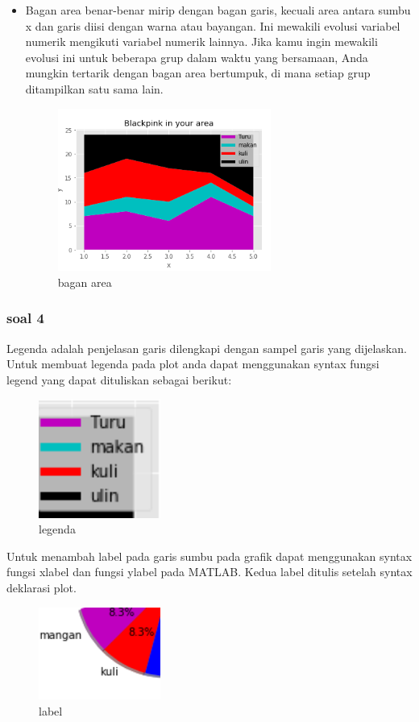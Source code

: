 \begin{itemize}
\item Bagan area benar-benar mirip dengan bagan garis, kecuali area antara sumbu x dan garis diisi dengan warna atau bayangan. Ini mewakili evolusi variabel numerik mengikuti variabel numerik lainnya. Jika kamu ingin mewakili evolusi ini untuk beberapa grup dalam waktu yang bersamaan, Anda mungkin tertarik dengan bagan area bertumpuk, di mana setiap grup ditampilkan satu sama lain.

\begin{figure}[H]
\centering
\includegraphics[width=7cm]{figures/6/1174009/1e.png}
\caption{bagan area}
\label{dwiyul}
\end{figure}

\end{itemize}

\subsubsection{soal 4}
Legenda adalah penjelasan garis dilengkapi dengan sampel garis yang dijelaskan. Untuk membuat legenda pada plot anda dapat menggunakan syntax fungsi legend yang dapat dituliskan sebagai berikut:

\begin{figure}[H]
\centering
\includegraphics[width=4cm]{figures/6/1174009/legenda.png}
\caption{legenda}
\label{dwiyul}
\end{figure}

Untuk menambah label pada garis sumbu pada grafik dapat menggunakan syntax fungsi xlabel dan fungsi ylabel pada MATLAB. Kedua label ditulis setelah syntax deklarasi plot.

\begin{figure}[H]
\centering
\includegraphics[width=4cm]{figures/6/1174009/label.png}
\caption{label}
\label{dwiyul}
\end{figure}


